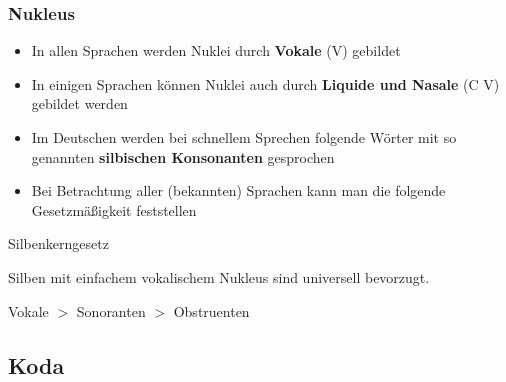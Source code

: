 \begin{frame}
\frametitle{Nukleus}

\begin{itemize}

	\item In allen Sprachen werden Nuklei durch \textbf{Vokale} (V) gebildet
	
	\item In einigen Sprachen können Nuklei auch durch \textbf{Liquide und Nasale} (C \ras V) gebildet werden
	
	\item Im Deutschen werden bei schnellem Sprechen folgende Wörter mit so genannten \textbf{silbischen Konsonanten} gesprochen
	
	
          \ea
           \textipa{[le:.z\textsyllabic{n}]} %
          \z
          
          \ea
           
          \z

	\item Bei Betrachtung aller (bekannten) Sprachen kann man die folgende Gesetzmäßigkeit feststellen \citep[cf.][217f.]{Hall00a}

\end{itemize}
	
	\begin{block}{Silbenkerngesetz}
	
	Silben mit einfachem vokalischem Nukleus sind universell bevorzugt.
	
	Vokale $>$ Sonoranten $>$ Obstruenten 
	
	\end{block}
	
\end{frame}



\subsection{Koda}

